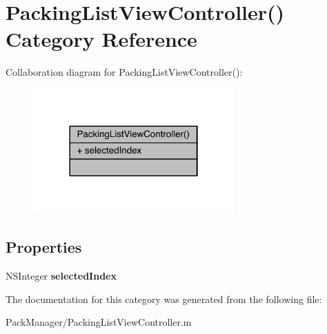 \hypertarget{category_packing_list_view_controller_07_08}{\section{Packing\-List\-View\-Controller() Category Reference}
\label{category_packing_list_view_controller_07_08}
}


Collaboration diagram for Packing\-List\-View\-Controller()\-:\nopagebreak
\begin{figure}[H]
\begin{center}
\leavevmode
\includegraphics[width=218pt]{category_packing_list_view_controller_07_08__coll__graph}
\end{center}
\end{figure}
\subsection*{Properties}
\begin{DoxyCompactItemize}
\item 
\hypertarget{category_packing_list_view_controller_07_08_aa490f06ed76cbd8f0d6094aa8df72a6b}{N\-S\-Integer {\bfseries selected\-Index}}\label{category_packing_list_view_controller_07_08_aa490f06ed76cbd8f0d6094aa8df72a6b}

\end{DoxyCompactItemize}


The documentation for this category was generated from the following file\-:\begin{DoxyCompactItemize}
\item 
Pack\-Manager/Packing\-List\-View\-Controller.\-m\end{DoxyCompactItemize}
